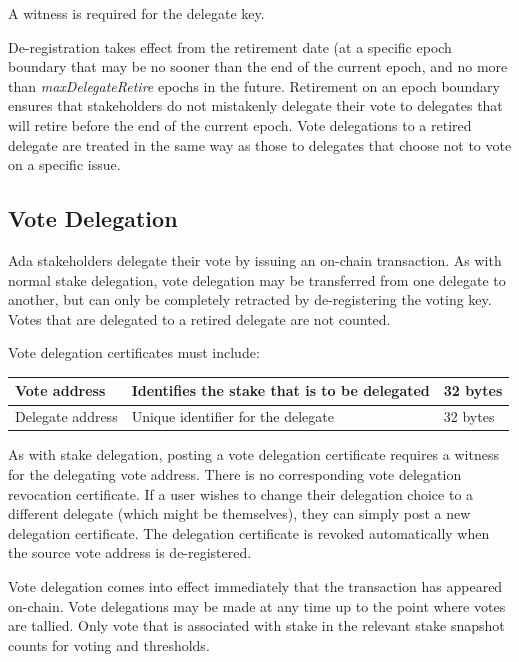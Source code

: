 A witness is required for the delegate key. %

De-registration takes effect from the retirement date (at a specific epoch boundary that may be no sooner than the end of the current epoch, and no more than \emph{maxDelegateRetire} epochs in the future.
Retirement on an epoch boundary ensures that stakeholders do not mistakenly delegate their vote to delegates that will retire before the end of the current epoch.
Vote delegations to a retired delegate are treated in the same way as those to delegates that choose not to vote on a specific issue.

\subsection{Vote Delegation}

Ada stakeholders delegate their vote by issuing an on-chain transaction.  As with normal stake delegation, vote delegation may be transferred from one delegate to another, but can only be completely retracted by de-registering the voting key.  Votes that are delegated to a retired delegate are not counted.

Vote delegation certificates must include:

\begin{center}
\begin{tabular}{||l|p{3in}|l||}
  \hline\hline
  Vote address & Identifies the stake that is to be delegated  & 32 bytes
  \\\hline
  Delegate address & Unique identifier for the delegate & 32 bytes
  \\\hline
  \hline
\end{tabular}
\end{center}
As with stake delegation, posting a vote delegation certificate requires a witness for the delegating vote address.
There is no corresponding vote delegation revocation certificate. If a user wishes to change their delegation choice to a different delegate (which might be themselves),
they can simply post a new delegation certificate. The delegation certificate is revoked automatically when the source vote address is de-registered.

Vote delegation comes into effect immediately that the transaction has appeared on-chain.  %
Vote delegations may be made at any time up to the point where votes are tallied.
Only vote that is associated with stake in the relevant stake snapshot counts for voting and thresholds.

